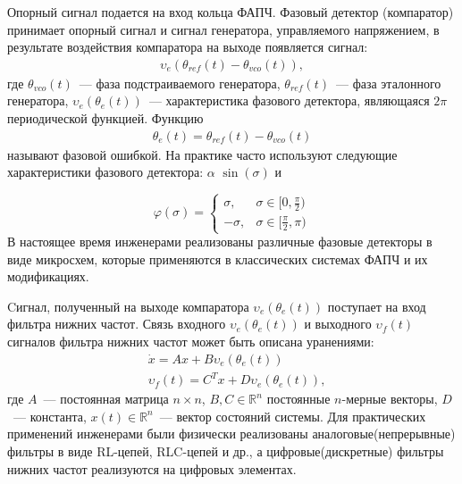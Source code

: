 \documentclass[a4paper,article,14pt]{extarticle}
\begin{document}
Опорный сигнал подается на вход кольца ФАПЧ. Фазовый детектор (компаратор) принимает опорный сигнал и сигнал генератора, управляемого напряжением, в результате воздействия компаратора на выходе появляется сигнал:
 \begin{equation*}
 \begin{aligned}
\upsilon_e(\theta_{ref}(t) - \theta_{vco}(t)),
 \end{aligned}
\end{equation*}
где $\theta_{vco}(t)$~--- фаза подстраиваемого генератора, $\theta_{ref}(t)$~--- фаза эталонного генератора, $\upsilon_e(\theta_e(t))$~--- характеристика фазового детектора, являющаяся $2\pi$ периодической функцией. Функцию
 \begin{equation}\label{phase_error}
 \begin{aligned}
\theta_e(t) = \theta_{ref}(t) - \theta_{vco}(t)
 \end{aligned}
\end{equation}
называют фазовой ошибкой. На практике часто используют следующие характеристики фазового детектора: $\alpha$ $\operatorname{sin}(\sigma)$ и 

\begin{equation*}
\varphi(\sigma) = 
 \begin{cases}
   \sigma, &\text{$\sigma \in [0,  \frac{\pi}{2})$}\\
   -\sigma, &\text{$\sigma \in [\frac{\pi}{2},  \pi)$}
 \end{cases}
\end{equation*}
В настоящее время инженерами реализованы различные фазовые детекторы в виде микросхем, которые применяются в классических системах ФАПЧ и их модификациях.

Cигнал, полученный на выходе компаратора $\upsilon_e(\theta_e(t))$ поступает на вход фильтра нижних частот. Связь входного $\upsilon_e(\theta_e(t))$ и выходного $\upsilon_f(t)$ сигналов фильтра нижних частот может быть описана уранениями:
 \begin{equation}\label{linear_block_eq}
 \begin{aligned}
&\dot{x} = Ax + B\upsilon_e(\theta_e(t))\\
&\upsilon_f(t) = C^Tx + D\upsilon_e(\theta_e(t)),
 \end{aligned}
\end{equation}
где $A$~--- постоянная матрица $n \times n$, $B, C \in \mathbb{R}^n$  постоянные $n$-мерные векторы, $D$~--- константа, $x(t) \in \mathbb{R}^n$~--- вектор состояний системы. Для практических применений инженерами были физически реализованы аналоговые(непрерывные) фильтры в виде RL-цепей, RLC-цепей и др., а цифровые(дискретные) фильтры нижних частот реализуются на цифровых элементах.
\end{document}
